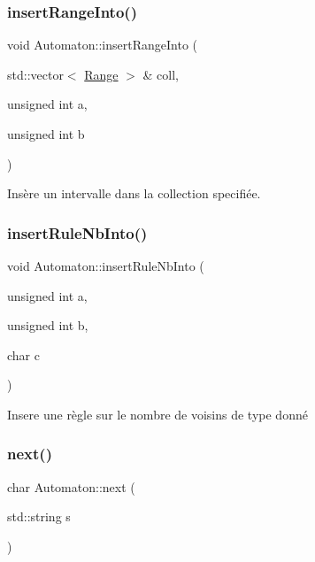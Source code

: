 \mbox{\label{class_automaton_a622c489cd8cc82000c3256ca0c40f48d}} 
\subsubsection{\texorpdfstring{insert\+Range\+Into()}{insertRangeInto()}}
{\footnotesize\ttfamily void Automaton\+::insert\+Range\+Into (\begin{DoxyParamCaption}\item[{std\+::vector$<$ \mbox{\hyperlink{struct_automaton_1_1_range}{Range}} $>$ \&}]{coll,  }\item[{unsigned int}]{a,  }\item[{unsigned int}]{b }\end{DoxyParamCaption})}



Insère un intervalle dans la collection specifiée. 

\mbox{\label{class_automaton_ad5365dca1251e866c57412b65f666ba6}} 
\subsubsection{\texorpdfstring{insert\+Rule\+Nb\+Into()}{insertRuleNbInto()}}
{\footnotesize\ttfamily void Automaton\+::insert\+Rule\+Nb\+Into (\begin{DoxyParamCaption}\item[{unsigned int}]{a,  }\item[{unsigned int}]{b,  }\item[{char}]{c }\end{DoxyParamCaption})\hspace{0.3cm}{\ttfamily [inline]}}



Insere une règle sur le nombre de voisins de type donné 

\mbox{\label{class_automaton_a6ce870e9a73694b40da41132198e7c31}} 
\subsubsection{\texorpdfstring{next()}{next()}}
{\footnotesize\ttfamily char Automaton\+::next (\begin{DoxyParamCaption}\item[{std\+::string}]{s }\end{DoxyParamCaption})}



